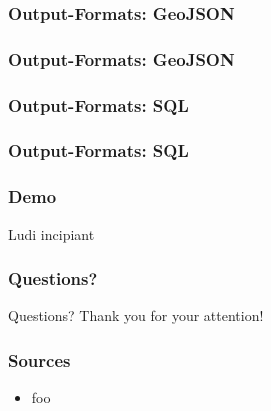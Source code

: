 \documentclass{beamer}
\begin{document}
\begin{frame}
    \frametitle{Output-Formats: GeoJSON}
    
\end{frame}

\begin{frame}
    \frametitle{Output-Formats: GeoJSON}
    
\end{frame}

\begin{frame}
    \frametitle{Output-Formats: SQL}
    
\end{frame}

\begin{frame}
    \frametitle{Output-Formats: SQL}
    
\end{frame}

\begin{frame}
    \frametitle{Demo}
    \begin{center}
        Ludi incipiant
    \end{center}
\end{frame}

\begin{frame}
    \frametitle{Questions?}
    \begin{center}
    Questions?
    \newline Thank you for your attention!
    \end{center}
\end{frame}

\begin{frame}
    \frametitle{Sources}
    \begin{itemize}
        \item foo
    \end{itemize}
\end{frame}
\end{document}
